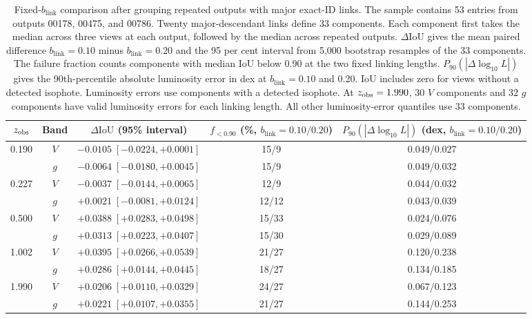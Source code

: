 \documentclass[usenatbib]{mnras}
\begin{document}
\begin{table}
\centering
\caption{Fixed-$b_{\mathrm{link}}$ comparison after grouping repeated outputs
with major exact-ID links. The sample contains 53 entries from outputs 00178,
00475, and 00786. Twenty major-descendant links define 33 components. Each
component first takes the median across three views at each output, followed
by the median across repeated outputs. $\Delta\mathrm{IoU}$ gives the mean
paired difference $b_{\mathrm{link}}=0.10$ minus $b_{\mathrm{link}}=0.20$ and
the 95 per cent interval from 5,000 bootstrap resamples of the 33 components.
The failure fraction counts components with median IoU below 0.90 at the two
fixed linking lengths. $P_{90}(|\Delta\log_{10}L|)$ gives the 90th-percentile
absolute luminosity error in dex at $b_{\mathrm{link}}=0.10$ and 0.20. IoU
includes zero for views without a detected isophote. Luminosity errors use
components with a detected isophote. At $z_{\rm obs}=1.990$, 30 $V$ components
and 32 $g$ components have valid luminosity errors for each linking length.
All other luminosity-error quantiles use 33 components.}
\label{tab:exactredshift}
\small
\setlength{\tabcolsep}{5pt}
\begin{tabular}{ccccc}
\toprule
$z_{\rm obs}$ & Band & $\Delta\mathrm{IoU}$ (95\% interval)
& $f_{<0.90}$ (\%, $b_{\mathrm{link}}=0.10/0.20$)
& $P_{90}(|\Delta\log_{10}L|)$ (dex, $b_{\mathrm{link}}=0.10/0.20$) \\
\midrule
0.190 & $V$ & $-0.0105\;[-0.0224,+0.0001]$ & 15/9 & 0.049/0.027 \\
 & $g$ & $-0.0064\;[-0.0180,+0.0045]$ & 15/9 & 0.049/0.032 \\
0.227 & $V$ & $-0.0037\;[-0.0144,+0.0065]$ & 12/9 & 0.044/0.032 \\
 & $g$ & $+0.0021\;[-0.0081,+0.0124]$ & 12/12 & 0.043/0.039 \\
0.500 & $V$ & $+0.0388\;[+0.0283,+0.0498]$ & 15/33 & 0.024/0.076 \\
 & $g$ & $+0.0313\;[+0.0223,+0.0407]$ & 15/30 & 0.029/0.089 \\
1.002 & $V$ & $+0.0395\;[+0.0266,+0.0539]$ & 21/27 & 0.120/0.238 \\
 & $g$ & $+0.0286\;[+0.0144,+0.0445]$ & 18/27 & 0.134/0.185 \\
1.990 & $V$ & $+0.0206\;[+0.0110,+0.0329]$ & 24/27 & 0.067/0.123 \\
 & $g$ & $+0.0221\;[+0.0107,+0.0355]$ & 21/27 & 0.144/0.253 \\
\bottomrule
\end{tabular}
\end{table}
\end{document}
